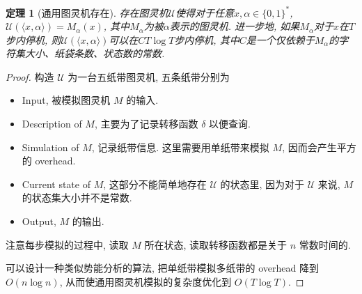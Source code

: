 \documentclass[8pt]{article}
\theoremstyle{compact}
\newtheorem{theorem}{定理}[section]
\begin{document}
\begin{theorem}[通用图灵机存在]
	存在图灵机$\mathcal U$使得对于任意$x, \alpha \in \{0, 1\}^*$, $\mathcal U(\langle x, \alpha \rangle ) = M_{\alpha}(x)$, 其中$M_{\alpha}$为被$\alpha$表示的图灵机. 进一步地, 如果$M_{\alpha}$对于$x$在$T$步内停机, 则$\mathcal U(\langle x, \alpha \rangle )$可以在$CT\log T$步内停机, 其中$C$是一个仅依赖于$M_{\alpha}$的字符集大小、纸袋条数、状态数的常数. 
\end{theorem}
\begin{proof}
	构造 $\mathcal U$ 为一台五纸带图灵机, 五条纸带分别为
	\begin{itemize}
		\item Input, 被模拟图灵机 $M$ 的输入.
		\item Description of $M$, 主要为了记录转移函数 $\delta$ 以便查询.
		\item Simulation of $M$, 记录纸带信息. 这里需要用单纸带来模拟 $M$, 因而会产生平方的 overhead.
		\item Current state of $M$, 这部分不能简单地存在 $\mathcal U$ 的状态里, 因为对于 $\mathcal U$ 来说, $M$ 的状态集大小并不是常数.
		\item Output, $M$ 的输出.
	\end{itemize}

	注意每步模拟的过程中, 读取 $M$ 所在状态, 读取转移函数都是关于 $n$ 常数时间的.

	可以设计一种类似势能分析的算法, 把单纸带模拟多纸带的 overhead 降到 $O(n \log n)$, 从而使通用图灵机模拟的复杂度优化到 $O(T \log T)$.
\end{proof}

\newpage
\end{document}

